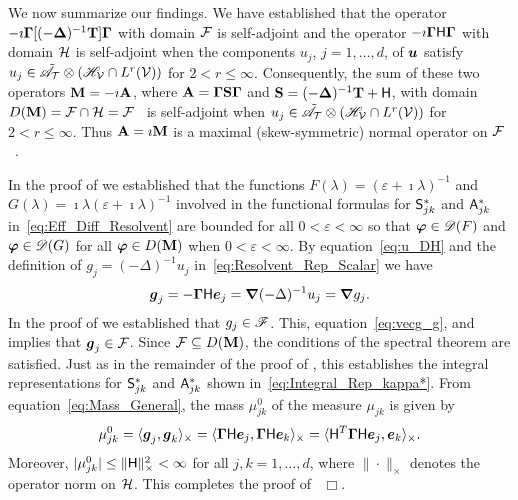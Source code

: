 \documentclass[amsa]{ipart}
\begin{document}
We now summarize our findings. We have established that the operator
$-\imath\mbox{\boldmath${\Gamma}$}[(-\mbox{\boldmath${\Delta}$})^{-1}\mathbf{T}]\mbox{\boldmath${\Gamma}$}$ with domain $\mathcal{F}$ is
self-adjoint and the operator $-\imath\mbox{\boldmath${\Gamma}$}\mathsf{H}\mbox{\boldmath${\Gamma}$}$ with domain $\mathcal{H}$
is self-adjoint when the components $u_j$, $j=1,\ldots,d$, of $\boldsymbol{u}$
satisfy $u_j\in\tilde{\mathscr{A}}_{\mathcal{T}}\otimes(\mathscr{H}_{\mathcal{V}}\cap L^r(\mathcal{V}))$ for
$2<r\leq\infty$. Consequently, the sum  of these two operators
$\mathbf{M}=-\imath\mathbf{A}$, where $\mathbf{A}=\mbox{\boldmath${\Gamma}$}\mathbf{S}\mbox{\boldmath${\Gamma}$}$ and
$\mathbf{S}=(-\mbox{\boldmath${\Delta}$})^{-1}\mathbf{T}+\mathsf{H}$, with domain
$D(\mathbf{M})=\mathcal{F}\cap\mathcal{H}=\mathcal{F}$~\cite{Stone:64} is self-adjoint when
$u_j\in\tilde{\mathscr{A}}_{\mathcal{T}}\otimes(\mathscr{H}_{\mathcal{V}}\cap L^r(\mathcal{V}))$ for $2<r\leq\infty$. Thus
$\mathbf{A}=\imath \mathbf{M}$ is a maximal (skew-symmetric) normal operator on
$\mathcal{F}$~\cite{Stone:64}.            




In the proof of  we established that the
functions $F(\lambda)=(\varepsilon+\imath\lambda)^{-1}$ and $G(\lambda)=\imath\lambda(\varepsilon+\imath\lambda)^{-1}$ involved in the
functional formulas for $\mathsf{S}^*_{jk}$ and $\mathsf{A}^*_{jk}$
in~\eqref{eq:Eff_Diff_Resolvent} are bounded for all $0<\varepsilon<\infty$ so 
that $\boldsymbol{\varphi}\in\mathscr{D}(F)$ and $\boldsymbol{\varphi}\in\mathscr{D}(G)$ for all $\boldsymbol{\varphi}\in
D(\mathbf{M})$ when $0<\varepsilon<\infty$. By equation~\eqref{eq:u_DH}
and the definition of $g_j=(-\Delta)^{-1}u_j$
in~\eqref{eq:Resolvent_Rep_Scalar} we have  
%
\begin{align}\label{eq:vecg_g}
  \vecg_j=-\bGamma\Hm\vece_j=\bnabla(-\Delta)^{-1}u_j=\bnabla g_j.
\end{align}
%
In the proof of  we established that
$g_j\in\mathscr{F}$. This, equation~\eqref{eq:vecg_g}, and
 implies that $\boldsymbol{g}_j\in\mathcal{F}$.  
Since $\mathcal{F}\subseteq D(\mathbf{M})$, the conditions of the spectral theorem are 
satisfied. Just as in the remainder of the proof of
, this establishes the integral
representations for $\mathsf{S}^*_{jk}$ and $\mathsf{A}^*_{jk}$ shown
in~\eqref{eq:Integral_Rep_kappa*}. From 
equation~\eqref{eq:Mass_General}, the mass $\mu_{jk}^0$ of the measure 
$\mu_{jk}$ is given by  
% 
\begin{align}\label{eq:Mass}
  \mu^0_{jk}   =\langle\vecg_j,\vecg_k\rangle_\times
        =\langle\bGamma\Hm\vece_j,\bGamma\Hm\vece_k\rangle_\times 
        =\langle\Hm^T\bGamma\Hm\vece_j,\vece_k\rangle_\times.     
\end{align}
%
Moreover,  $|\mu^0_{jk}|\leq\|\mathsf{H}\|_\times^2<\infty$ for all $j,k=1,\ldots,d$, where $\|\cdot\|_\times$
denotes the operator norm on $\mathcal{H}$. This completes the proof
of~ $\Box$.  
\end{document}

